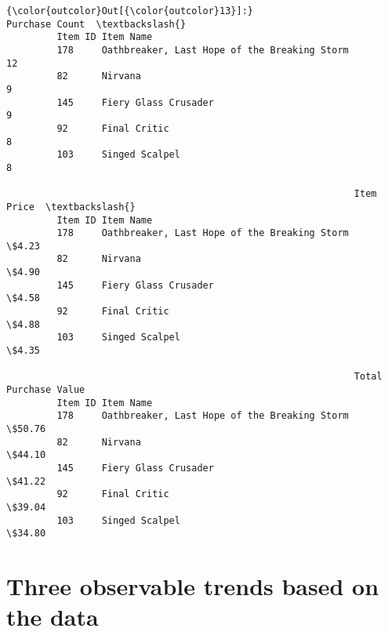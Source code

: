\documentclass[11pt]{article}
\begin{document}
\begin{Verbatim}[commandchars=\\\{\}]
{\color{outcolor}Out[{\color{outcolor}13}]:}                                                       Purchase Count  \textbackslash{}
         Item ID Item Name                                                      
         178     Oathbreaker, Last Hope of the Breaking Storm              12   
         82      Nirvana                                                    9   
         145     Fiery Glass Crusader                                       9   
         92      Final Critic                                               8   
         103     Singed Scalpel                                             8   
         
                                                              Item Price  \textbackslash{}
         Item ID Item Name                                                 
         178     Oathbreaker, Last Hope of the Breaking Storm      \$4.23   
         82      Nirvana                                           \$4.90   
         145     Fiery Glass Crusader                              \$4.58   
         92      Final Critic                                      \$4.88   
         103     Singed Scalpel                                    \$4.35   
         
                                                              Total Purchase Value  
         Item ID Item Name                                                          
         178     Oathbreaker, Last Hope of the Breaking Storm               \$50.76  
         82      Nirvana                                                    \$44.10  
         145     Fiery Glass Crusader                                       \$41.22  
         92      Final Critic                                               \$39.04  
         103     Singed Scalpel                                             \$34.80  
\end{Verbatim}
            
    \section{Three observable trends based on the
data}\label{three-observable-trends-based-on-the-data}
\end{document}
